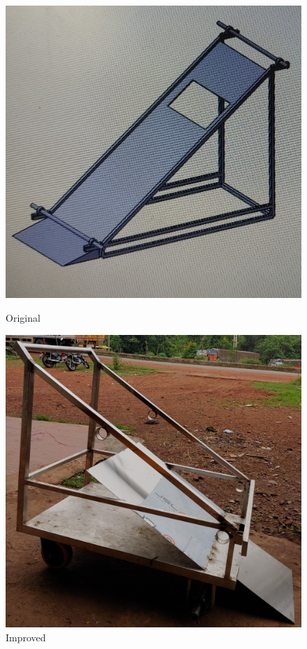 \begin{figure}[H]
  \centering
    \begin{minipage}{0.40\textwidth}
    \centering
      \includegraphics[width=1\textwidth]{Original 1.jpg}
      \caption{Original}
      \label{fig:Original 1}
    \end{minipage}
\hfill
    \begin{minipage}{0.40\textwidth}
    \centering
      \includegraphics[width=1\textwidth]{Improved 1.jpg}
      \caption{Improved}
      \label{fig:Improved 1}
    \end{minipage}
\end{figure}





